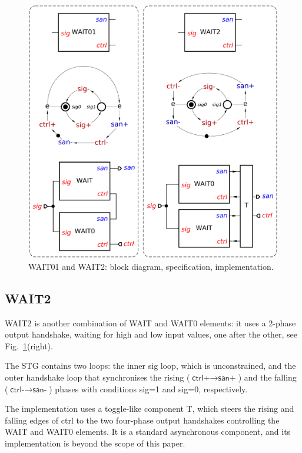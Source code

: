 \documentclass[conference]{IEEEtran}
\begin{document}
\begin{figure}
\begin{center}
    \includegraphics[scale=0.23]{fig/WAIT01-and-WAIT2.pdf}
    \caption{\textsf{WAIT01} and \textsf{WAIT2}: block diagram,
    specification, implementation.}
    \label{fig:wait012}
    \vspace{-4mm}
\end{center}
\end{figure}

\subsection*{\textsf{WAIT2}}

\textsf{WAIT2} is another combination of \textsf{WAIT} and \textsf{WAIT0} elements:
it uses a 2-phase output handshake, waiting for high and low input values, one after
the other, see Fig.~\ref{fig:wait012}(right).

The STG contains two loops: the inner \textsf{sig} loop, which is unconstrained, and
the outer handshake loop that synchronises the rising
($\textsf{ctrl+} \longrightarrow \textsf{san+}$)
 and the falling
($\textsf{ctrl-} \longrightarrow \textsf{san-}$)
phases with conditions \textsf{sig=1} and \textsf{sig=0}, respectively.

The implementation uses a toggle-like component \textsf{T}, which steers the rising and
falling edges of \textsf{ctrl} to the two four-phase output handshakes controlling
the \textsf{WAIT} and \textsf{WAIT0} elements. It is a standard
asynchronous component, and its implementation is beyond the scope of this paper.
\end{document}
